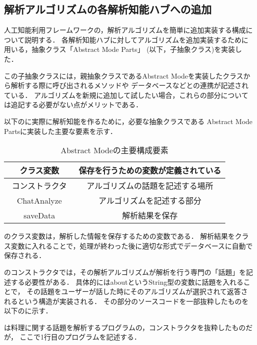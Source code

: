 \subsection{解析アルゴリズムの各解析知能ハブへの追加}\label{sec:anaAdd}
人工知能利用フレームワークの，解析アルゴリズムを簡単に追加実装する構成について説明する．
各解析知能ハブに対してアルゴリズムを追加実装するために用いる，抽象クラス「Abstract Mode Parts」
(以下，子抽象クラス)を実装した．

この子抽象クラスには，親抽象クラスであるAbstract Modeを実装したクラスから解析する際に呼び出されるメソッドや
データベースなどとの連携が記述されている．
アルゴリズムを新規に追加して試したい場合，これらの部分については追記する必要がない点がメリットである．

以下のに実際に解析知能を作るために，必要な抽象クラスである
Abstract Mode Partsに実装した主要な要素を示す．

\begin{table}[tbh]
	\caption{Abstract Modeの主要構成要素} \label{tab:Abstract Mode Parts}
	\begin{center}
		\begin{tabular}[htb]{c|c}
		\hline
		クラス変数 & 保存を行うための変数が定義されている \\ \hline
		コンストラクタ　& アルゴリズムの話題を記述する場所 \\ \hline
		ChatAnalyze & アルゴリズムを記述する部分 \\ \hline
		saveData & 解析結果を保存 \\ \hline
		\end{tabular}
	\end{center}
\end{table}

のクラス変数は，解析した情報を保存するための変数である．
解析結果をクラス変数に入れることで，処理が終わった後に適切な形式でデータベースに自動で保存される．

のコンストラクタでは，その解析アルゴリズムが解析を行う専門の「話題」を記述する必要性がある．
具体的にはaboutというString型の変数に話題を入れることで，
その話題をユーザーが話した時にそのアルゴリズムが選択されて返答されるという構造が実装される．
その部分のソースコードを一部抜粋したものを以下のに示す．


は料理に関する話題を解析するプログラムの，コンストラクタを抜粋したものだが，
ここで1行目のプログラムを記述する．

